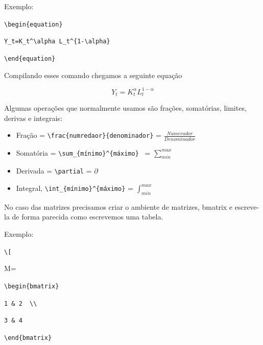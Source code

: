 \documentclass[12pt,oneside,a4paper,chapter=TITLE,english,brazil,sumario=abnt-6027-2012]{abntex2}
\begin{document}
\vspace{0.2cm}

Exemplo:

\vspace{0.2cm}

\verb|\begin{equation}|

\verb|Y_t=K_t^\alpha L_t^{1-\alpha}|

\verb|\end{equation}|

\vspace{0.2cm}

Compilando esses comando chegamos a seguinte equação

\vspace{0.2cm}

\begin{equation}\label{equ1}
Y_t=K_t^\alpha L_t^{1-\alpha}
\end{equation}

Algumas operações que normalmente usamos são frações, somatórias, limites, derivas e integrais:

\begin{itemize}
	\item Fração = \verb|\frac{numredaor}{denominador}| = $\frac{Numerador}{Denominador}$
	
	\item Somatória = \verb|\sum_{mínimo}^{máximo} | = $\sum_{min}^{max}$
	
	\item Derivada = \verb|\partial| = $\partial$ 
	
	\item Integral, \verb|\int_{mínimo}^{máximo}| = $\int_{min}^{max}$
	
\end{itemize}

No caso das matrizes precisamos criar o ambiente de matrizes, bmatrix e escreve-la de forma parecida como escrevemos uma tabela.

\vspace{0.2cm}
Exemplo: 
\vspace{0.2cm}

\verb|\[|

M=

\verb|\begin{bmatrix}|

\verb|1 & 2  \\|

\verb|3 & 4 |

\verb|\end{bmatrix}|
\end{document}
